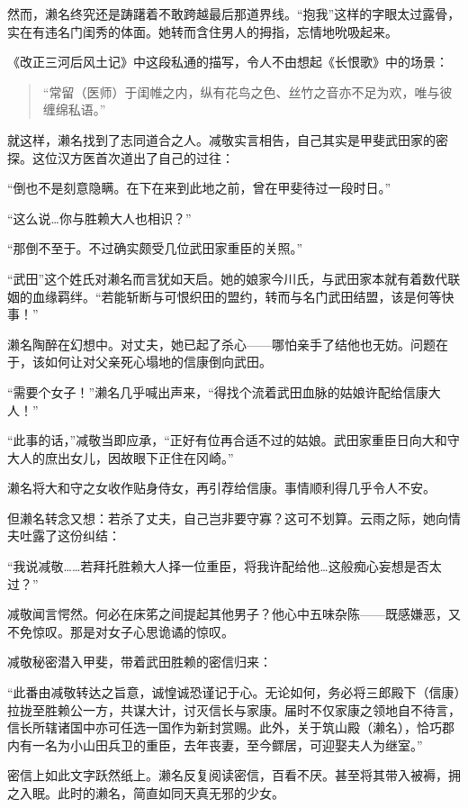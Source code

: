 \documentclass[
]{book}
\begin{document}
然而，濑名终究还是踌躇着不敢跨越最后那道界线。``抱我''这样的字眼太过露骨，实在有违名门闺秀的体面。她转而含住男人的拇指，忘情地吮吸起来。

《改正三河后风土记》中这段私通的描写，令人不由想起《长恨歌》中的场景：

\begin{quote}
``常留（医师）于闺帷之内，纵有花鸟之色、丝竹之音亦不足为欢，唯与彼缠绵私语。''
\end{quote}

就这样，濑名找到了志同道合之人。减敬实言相告，自己其实是甲斐武田家的密探。这位汉方医首次道出了自己的过往：

``倒也不是刻意隐瞒。在下在来到此地之前，曾在甲斐待过一段时日。''

``这么说\ldots 你与胜赖大人也相识？''

``那倒不至于。不过确实颇受几位武田家重臣的关照。''

``武田''这个姓氏对濑名而言犹如天启。她的娘家今川氏，与武田家本就有着数代联姻的血缘羁绊。``若能斩断与可恨织田的盟约，转而与名门武田结盟，该是何等快事！''

濑名陶醉在幻想中。对丈夫，她已起了杀心------哪怕亲手了结他也无妨。问题在于，该如何让对父亲死心塌地的信康倒向武田。

``需要个女子！''濑名几乎喊出声来，``得找个流着武田血脉的姑娘许配给信康大人！''

``此事的话，''减敬当即应承，``正好有位再合适不过的姑娘。武田家重臣日向大和守大人的庶出女儿，因故眼下正住在冈崎。''

濑名将大和守之女收作贴身侍女，再引荐给信康。事情顺利得几乎令人不安。

但濑名转念又想：若杀了丈夫，自己岂非要守寡？这可不划算。云雨之际，她向情夫吐露了这份纠结：

``我说减敬\ldots\ldots 若拜托胜赖大人择一位重臣，将我许配给他\ldots 这般痴心妄想是否太过？''

减敬闻言愕然。何必在床笫之间提起其他男子？他心中五味杂陈------既感嫌恶，又不免惊叹。那是对女子心思诡谲的惊叹。

减敬秘密潜入甲斐，带着武田胜赖的密信归来：

``此番由减敬转达之旨意，诚惶诚恐谨记于心。无论如何，务必将三郎殿下（信康）拉拢至胜赖公一方，共谋大计，讨灭信长与家康。届时不仅家康之领地自不待言，信长所辖诸国中亦可任选一国作为新封赏赐。此外，关于筑山殿（濑名），恰巧郡内有一名为小山田兵卫的重臣，去年丧妻，至今鳏居，可迎娶夫人为继室。''

密信上如此文字跃然纸上。濑名反复阅读密信，百看不厌。甚至将其带入被褥，拥之入眠。此时的濑名，简直如同天真无邪的少女。
\end{document}
